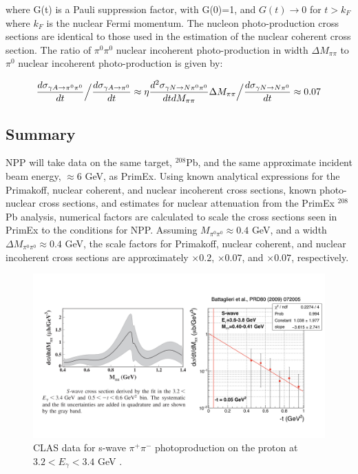 where G(t) is a Pauli suppression factor, with G(0)=1, and $G(t)\rightarrow 0$ for $t> k_F$ where $k_F$ is the nuclear Fermi momentum.   The nucleon photo-production cross sections are identical to those used in the estimation of the nuclear coherent cross section.    The ratio of  $\pi^0 \pi^0$ nuclear incoherent photo-production in  width $\Delta M_{\pi \pi}$  to $\pi^0$ nuclear incoherent photo-production is given by: 

$$  {d\sigma_{\gamma A \rightarrow  \pi^0 \pi^0} \over dt}  \Big/ { d\sigma_{\gamma A \rightarrow  \pi^0} \over dt}  \approx \eta 
 {d^2\sigma_{\gamma N \rightarrow N \pi^0 \pi^0} \over dt dM_{\pi \pi} }  \Delta M_{\pi \pi}\Big/ { d\sigma_{\gamma N \rightarrow N \pi^0} \over dt} \approx 0.07 $$

\subsection{Summary}
NPP will take data on the same target, $^{208}$Pb, and the same approximate incident beam energy, $\approx 6$ GeV, as PrimEx. Using known analytical expressions for the Primakoff, nuclear coherent, and nuclear incoherent cross sections, known photo-nuclear cross sections, and estimates for nuclear attenuation from the PrimEx $^{208}$Pb analysis, numerical factors are calculated to scale the cross sections seen in PrimEx to the 
conditions for NPP.  Assuming $M_{\pi^0 \pi^0} \approx 0.4$ GeV, and a width  $\Delta M_{\pi^0 \pi^0} \approx 0.4$ GeV, the scale factors for Primakoff, nuclear coherent, and nuclear incoherent cross sections are approximately $\times 0.2$, $\times 0.07$, and $\times 0.07$, respectively. 

\begin{figure}
\centering
\includegraphics[width=6in]{figures/f0_500.png}
\caption{CLAS data for s-wave $\pi^+ \pi^-$ photoproduction on the proton at $3.2 < E_\gamma < 3.4$ GeV \cite{Battaglieri:2009aa}. }
\label{f0_500}
\end{figure}

